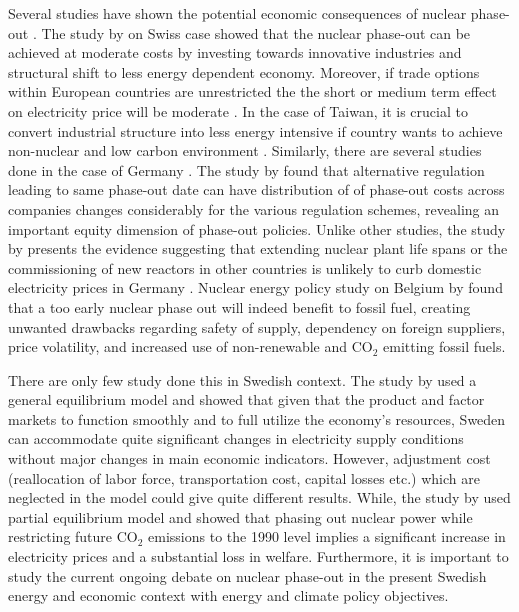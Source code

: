 Several studies have shown the potential economic consequences of nuclear phase-out \citep{Bohringer2002, Nestle2012, Bretschger2012, Duscha0, Glomsrod2013, Kunsch2014}. The study by \cite{Bretschger2012} on Swiss case showed that the nuclear phase-out can be achieved at moderate costs by investing towards innovative industries and structural shift to less energy dependent economy. Moreover, if trade options within European countries are unrestricted the the short or medium term effect on electricity price will be moderate \citep{Glomsrod2013}. In the case of Taiwan, it is crucial to convert industrial structure into less energy intensive if country wants to achieve non-nuclear and low carbon environment \citep{Chen2013}. Similarly, there are several studies done in the case of Germany \citep{Bohringer2002, Nestle2012, Bruninx2013}. The study by \cite{Bohringer2002} found that alternative regulation leading to same phase-out date can have distribution of of phase-out costs across companies changes considerably for the various regulation schemes, revealing an important equity dimension of phase-out policies. Unlike other studies, the study by \citep{Nestle2012} presents the evidence suggesting that extending nuclear plant life spans or the commissioning of new reactors in other countries is unlikely to curb domestic electricity prices in Germany \citep{Nestle2012}. Nuclear energy policy study on Belgium by \cite{Kunsch2014} found that a too early nuclear phase out will indeed benefit to fossil fuel, creating unwanted drawbacks regarding safety of supply, dependency on foreign suppliers, price volatility, and increased use of non-renewable and CO$_2$ emitting fossil fuels.

There are only few study done this in Swedish context. The study by \citep{Bergman1981} used a general equilibrium model and showed that given that the product and factor markets to function smoothly and to full utilize the economy's resources, Sweden can accommodate quite significant changes in electricity supply conditions without major changes in main economic indicators. However, adjustment cost (reallocation of labor force, transportation cost, capital losses etc.) which are neglected in the model could give quite different results. While, the study by \cite{ Andersson1997} used partial equilibrium model and showed that phasing out nuclear power while restricting future CO$_2$ emissions to the 1990 level implies a significant increase in electricity prices and a substantial loss in welfare. Furthermore, it is important to study the current ongoing debate on nuclear phase-out in the present Swedish energy and economic context with energy and climate policy objectives.

